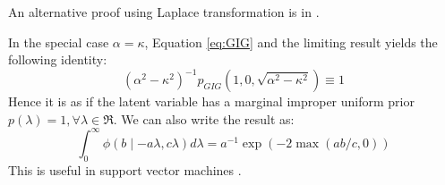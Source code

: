 \documentclass[lineno]{biometrika}
\begin{document}
An alternative proof using Laplace transformation is in \cite{polson2013bayesian}. 
\begin{remark}
In the special case $\alpha = \kappa$, Equation \eqref{eq:GIG} and the limiting result yields the following identity: 
$$
(\alpha^2-\kappa^2)^{-1}p_{GIG}(1,0,\sqrt{\alpha^2-\kappa^2}) \equiv 1
$$
Hence it is as if the latent variable has a marginal improper uniform prior $p(\lambda) = 1, \forall \lambda \in \Re$. We can also write the result as: 
\begin{equation}
  \int_{0}^{\infty} \phi(b \mid -a\lambda, c\lambda) d\lambda = a^{-1} \exp(-2 \max(ab/c,0)) \label{eq:svm}
\end{equation}
This is useful in support vector machines \cite{polson2011data}.
\end{remark}
\end{document}
